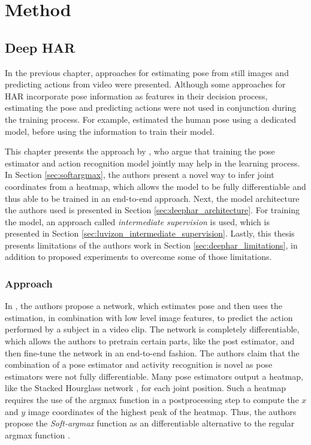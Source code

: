 \chapter{Method}
\section{Deep HAR}
\label{sec:chapter4}
In the previous chapter, approaches for estimating pose from still images and predicting actions from video were presented.
Although some approaches for HAR incorporate pose information as features in their decision process, estimating the pose and predicting actions were not used in conjunction during the training process.
For example, \cite{choutas_potion:_2018}  estimated the human pose using a dedicated model, before using the information to train their model.

This chapter presents the approach by \cite{luvizon_2d/3d_2018}, who argue that training the pose estimator and action recognition model jointly may help in the learning process.
In Section \ref{sec:softargmax}, the authors present a novel way to infer joint coordinates from a heatmap, which allows the model to be fully differentiable and thus able to be trained in an end-to-end approach.
Next, the model architecture the authors used is presented in Section \ref{sec:deephar_architecture}.
For training the model, an approach called \textit{intermediate supervision} is used, which is presented in Section \ref{sec:luvizon_intermediate_supervision}.
Lastly, this thesis presents limitations of the authors work in Section \ref{sec:deephar_limitations}, in addition to proposed experiments to overcome some of those limitations.

\subsection{Approach}
\label{sec:deephar_approach}

In \cite{luvizon_2d/3d_2018}, the authors propose a network, which estimates pose and then uses the estimation, in combination with low level image features, to predict the action performed by a subject in a video clip.
The network is completely differentiable, which allows the authors to pretrain certain parts, like the post estimator, and then fine-tune the network in an end-to-end fashion.
The authors claim that the combination of a pose estimator and activity recognition is novel as pose estimators were not fully differentiable.
Many pose estimators output a heatmap, like the Stacked Hourglass network \cite{newell_stacked_2016} , for each joint position.
Such a heatmap requires the use of the argmax function in a postprocessing step to compute the $x$ and $y$ image coordinates of the highest peak of the heatmap.
Thus, the authors propose the \textit{Soft-argmax} function as an differentiable alternative to the regular argmax function .

